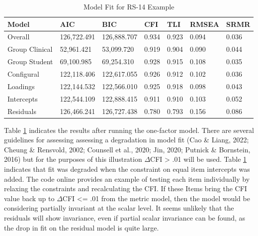 \documentclass[
  man]{apa7}
\begin{document}
\begin{table}[tbp]

\begin{center}
\begin{threeparttable}

\caption{\label{tab:rs-table}Model Fit for RS-14 Example}

\begin{tabular}{lllllll}
\toprule
Model & AIC & BIC & CFI & TLI & RMSEA & SRMR\\
\midrule
Overall & 126,722.491 & 126,888.707 & 0.934 & 0.923 & 0.094 & 0.036\\
Group Clinical & 52,961.421 & 53,099.720 & 0.919 & 0.904 & 0.090 & 0.044\\
Group Student & 69,100.985 & 69,254.310 & 0.928 & 0.915 & 0.108 & 0.035\\
Configural & 122,118.406 & 122,617.055 & 0.926 & 0.912 & 0.102 & 0.036\\
Loadings & 122,144.532 & 122,566.010 & 0.925 & 0.918 & 0.098 & 0.043\\
Intercepts & 122,544.109 & 122,888.415 & 0.911 & 0.910 & 0.103 & 0.052\\
Residuals & 126,466.241 & 126,727.438 & 0.780 & 0.793 & 0.156 & 0.086\\
\bottomrule
\end{tabular}

\end{threeparttable}
\end{center}

\end{table}

Table \ref{tab:rs-table} indicates the results after running the one-factor model. There are several guidelines for assessing assessing a degradation in model fit (Cao \& Liang, 2022; Cheung \& Rensvold, 2002; Counsell et al., 2020; Jin, 2020; Putnick \& Bornstein, 2016) but for the purposes of this illustration \(\Delta\)CFI \textgreater{} .01 will be used. Table \ref{tab:rs-table} indicates that fit was degraded when the constraint on equal item intercepts was added. The code online provides an example of testing each item individually by relaxing the constraints and recalculating the CFI. If these Items bring the CFI value back up to \(\Delta\)CFI \textless= .01 from the metric model, then the model would be considering partially invariant at the scalar level. It seems unlikely that the residuals will show invariance, even if partial scalar invariance can be found, as the drop in fit on the residual model is quite large.
\end{document}
